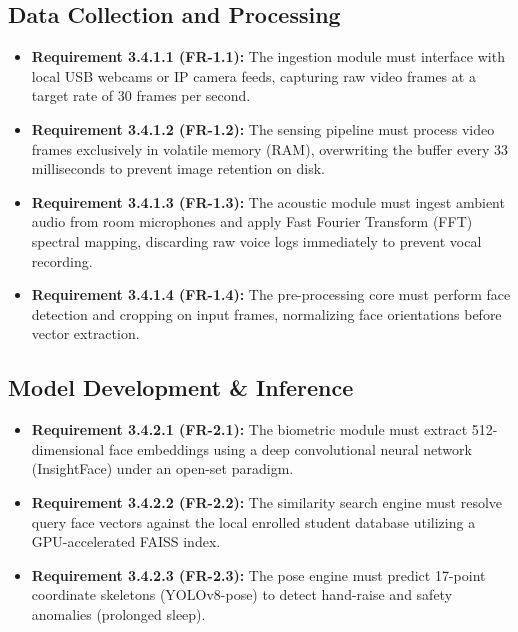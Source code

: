 \documentclass[12pt,a4paper,oneside]{report}
\begin{document}
\subsection{Data Collection and Processing}
\begin{itemize}
    \item \textbf{Requirement 3.4.1.1 (FR-1.1):} The ingestion module must interface with local USB webcams or IP camera feeds, capturing raw video frames at a target rate of 30 frames per second.
    \item \textbf{Requirement 3.4.1.2 (FR-1.2):} The sensing pipeline must process video frames exclusively in volatile memory (RAM), overwriting the buffer every 33 milliseconds to prevent image retention on disk.
    \item \textbf{Requirement 3.4.1.3 (FR-1.3):} The acoustic module must ingest ambient audio from room microphones and apply Fast Fourier Transform (FFT) spectral mapping, discarding raw voice logs immediately to prevent vocal recording.
    \item \textbf{Requirement 3.4.1.4 (FR-1.4):} The pre-processing core must perform face detection and cropping on input frames, normalizing face orientations before vector extraction.
\end{itemize}

\subsection{Model Development \& Inference}
\begin{itemize}
    \item \textbf{Requirement 3.4.2.1 (FR-2.1):} The biometric module must extract 512-dimensional face embeddings using a deep convolutional neural network (InsightFace) under an open-set paradigm.
    \item \textbf{Requirement 3.4.2.2 (FR-2.2):} The similarity search engine must resolve query face vectors against the local enrolled student database utilizing a GPU-accelerated FAISS index.
    \item \textbf{Requirement 3.4.2.3 (FR-2.3):} The pose engine must predict 17-point coordinate skeletons (YOLOv8-pose) to detect hand-raise and safety anomalies (prolonged sleep).
\end{itemize}
\end{document}
